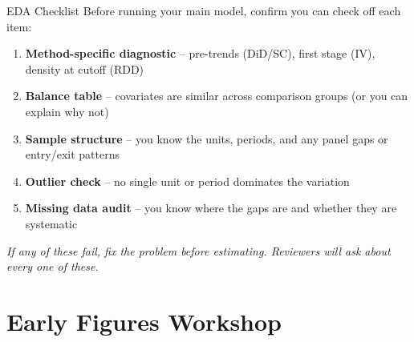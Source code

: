 \begin{frame}{EDA Checklist}
  Before running your main model, confirm you can check off each item:

  \vspace{6pt}

  \begin{enumerate}
    \item[\checkmark] \textbf{Method-specific diagnostic} -- pre-trends (DiD/SC), first stage (IV), density at cutoff (RDD)

    \vspace{2pt}

    \item[\checkmark] \textbf{Balance table} -- covariates are similar across comparison groups (or you can explain why not)

    \vspace{2pt}

    \item[\checkmark] \textbf{Sample structure} -- you know the units, periods, and any panel gaps or entry/exit patterns

    \vspace{2pt}

    \item[\checkmark] \textbf{Outlier check} -- no single unit or period dominates the variation

    \vspace{2pt}

    \item[\checkmark] \textbf{Missing data audit} -- you know where the gaps are and whether they are systematic
  \end{enumerate}

  \vspace{4pt}

  \textit{If any of these fail, fix the problem before estimating. Reviewers will ask about every one of these.}
\end{frame}


\section{Early Figures Workshop}

